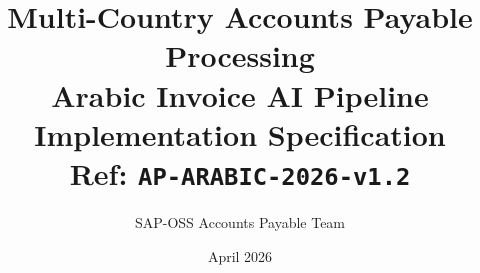 \documentclass[11pt,a4paper,twoside]{report}
\begin{document}
\title{\vspace{-2em}\Large Multi-Country Accounts Payable Processing \\
       \textbf{Arabic Invoice AI Pipeline} \\
       \large Implementation Specification \\
       \small Ref: \texttt{AP-ARABIC-2026-v1.2}}
\author{SAP-OSS Accounts Payable Team}
\date{April 2026}

\maketitle



















\end{document}
